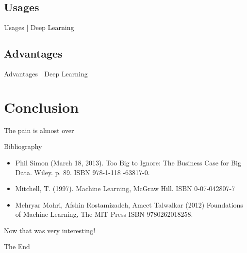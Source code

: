 \documentclass[10pt]{beamer}
\begin{document}
		\subsection{Usages}
			\begin{frame}{Usages | Deep Learning}
			\end{frame}
		\subsection{Advantages}
			\begin{frame}{Advantages | Deep Learning}
			\end{frame}
	
	
	
	\section{Conclusion}
		\begin{frame}{The pain is almost over}
		\end{frame}
		\begin{frame}{Bibliography}
			\twocolumn
			\begin{itemize}
				\item \scriptsize{Phil Simon (March 18, 2013). Too Big to Ignore: The Business Case for Big Data. Wiley. p. 89. ISBN 978-1-118
					-63817-0.}
				\item \scriptsize{Mitchell, T. (1997). Machine Learning, McGraw Hill. ISBN 0-07-042807-7}
				\item \scriptsize{ Mehryar Mohri, Afshin Rostamizadeh, Ameet Talwalkar (2012) Foundations of Machine Learning, The MIT Press ISBN 9780262018258.}
			\end{itemize}
			\onecolumn
		\end{frame}
\endgroup

\begingroup
	\begin{frame}[plain,c]
		\hspace*{6 mm}
		\vspace*{-18 mm}
		\textcolor{blue_light}{\Large{Now that was very interesting!}}
	\end{frame}
	\begin{frame}[plain,c]
		\hspace*{27 mm}
		\vspace*{-20 mm}
		\textcolor{blue_light}{\Large{The End}}
	\end{frame}
\endgroup
\end{document}
